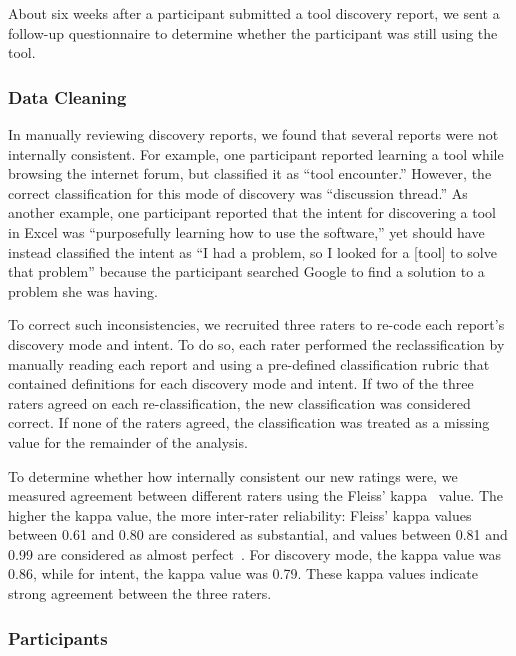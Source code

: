 \documentclass[smallextended]{svjour3}
\begin{document}
About six weeks after a participant submitted a tool discovery report,
we sent a follow-up questionnaire to determine whether the participant was still
using the tool.

\subsubsection{Data Cleaning}\label{sec:cleaning}

\noindent
In manually reviewing discovery reports, we found that several reports
were not internally consistent.
For example, one participant reported learning a tool while browsing the internet forum,
but classified it as ``tool encounter.''
However, the correct classification for this mode of discovery was ``discussion thread.''
As another example, one participant reported that the intent for discovering 
a tool in Excel was ``purposefully learning how to use the software,'' 
yet should have instead classified the intent as ``I had a problem,
so I looked for a [tool] to solve that problem''
because the participant searched Google to find a solution to a problem she was having.

To correct such inconsistencies, we recruited three raters to re-code each report's 
discovery mode and intent.
To do so, each rater performed the reclassification by manually reading each report 
and using a pre-defined classification rubric that contained definitions 
for each discovery mode and intent.
If two of the three raters agreed on each re-classification, the new classification
was considered correct.
If none of the raters agreed, the classification was treated as a missing value for
the remainder of the analysis.

To determine whether how internally consistent our new ratings were,
we measured agreement between different raters using the Fleiss' kappa~\cite{fleiss1981measurement} value.
The higher the kappa value, the more inter-rater reliability:
Fleiss' kappa values between 0.61 and 0.80 are considered as substantial, 
and values between 0.81 and 0.99 are considered as almost perfect~\cite{landis77}. 
For discovery mode, the kappa value was 0.86, 
while for intent, the kappa value was 0.79.
These kappa values indicate strong agreement between the three raters.  
 
 
\subsubsection{Participants}
 
\end{document}
